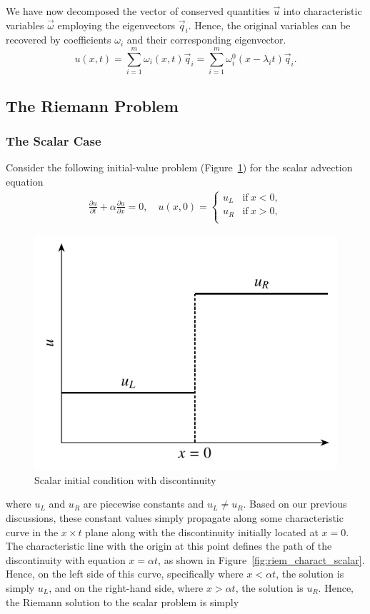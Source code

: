We have now decomposed the vector of conserved quantities $\vec u$ into characteristic variables $\vec \omega$ employing the eigenvectors $\vec q_i$. Hence, the original variables can be recovered by coefficients $\omega_i$ and their corresponding eigenvector.
\begin{equation}
	u(x,t) = \sum_{i=1}^{m} \omega_i(x,t) \vec q_i=\sum_{i=1}^m \omega^0_i(x-\lambda_i t) \vec q_i.
	\label{eq:linsuperposition}
\end{equation}
\subsection{The Riemann Problem}
\subsubsection{The Scalar Case}
Consider the following initial-value problem (Figure~\ref{fig:scalar_riemann_u0}) for the scalar advection equation 
\begin{align}
	\frac{\partial u}{\partial t} + \alpha \frac{\partial u}{\partial x} = 0, \quad u(x,0) = 
	\begin{cases}
		u_L & \text{if}~x<0,\\
		u_R & \text{if}~x>0,\\
	\end{cases}
\end{align}
\begin{figure}[htbp]
	\centering
	\includegraphics[width=0.5\linewidth]{Pictures/ch11_riem_lsc_u0}
	\caption{Scalar initial condition with discontinuity}
	\label{fig:scalar_riemann_u0}
\end{figure}
where $u_L$ and $u_R$ are piecewise constants and $u_L\neq u_R$. Based on our previous discussions, these constant values simply propagate along some characteristic curve in the $x\times t$ plane along with the discontinuity initially located at $x=0$. The characteristic line with the origin at this point defines the path of the discontinuity with equation $x=\alpha t$, as shown in Figure~\ref{fig:riem_charact_scalar}. Hence, on the left side of this curve, specifically where $x<\alpha t$, the solution is simply $u_L$, and on the right-hand side, where $x>\alpha t$, the solution is $u_R$. Hence, the Riemann solution to the scalar problem is simply
